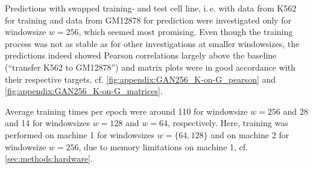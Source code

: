 Predictions with swapped training- and test cell line, i.\,e. with data from K562 for training and data from GM12878 for prediction 
were investigated only for windowsize $w=256$, which seemed most promising. 
Even though the training process was not as stable as for other investigations at smaller windowsizes, 
the predictions indeed showed Pearson correlations largely above the baseline (``transfer K562 to GM12878'') 
and matrix plots were in good accordance with their respective targets, cf. \cref{fig:appendix:GAN256_K-on-G_pearson} and \ref{fig:appendix:GAN256_K-on-G_matrices}.

Average training times per epoch were around \SI{110}{\min} for windowsize $w=256$
and \SI{28}{\min} and \SI{14}{\min} for windowsizes $w=128$ and $w=64$, respectively.
Here, training was performed on machine 1 for windowsizes $w=\{64,128\}$ and on machine 2 for windowsize $w=256$,
due to memory limitations on machine 1, cf. \cref{sec:methods:hardware}.

